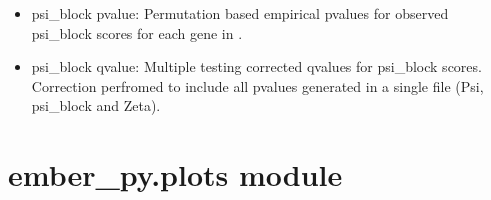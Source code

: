 \documentclass[letterpaper,10pt,english]{sphinxmanual}
\begin{document}
\begin{fulllineitems}
\begin{itemize}
\item {} 
\sphinxAtStartPar
psi\_block p\sphinxhyphen{}value: Permutation based empirical p\sphinxhyphen{}values for observed psi\_block scores for each gene in .

\item {} 
\sphinxAtStartPar
psi\_block q\sphinxhyphen{}value: Multiple testing corrected q\sphinxhyphen{}values for psi\_block scores. Correction perfromed to include all p\sphinxhyphen{}values generated in a single file (Psi, psi\_block and Zeta).

\end{itemize}

\end{fulllineitems}



\section{ember\_py.plots module}
\label{\detokenize{ember_py:module-ember_py.plots}}\label{\detokenize{ember_py:ember-py-plots-module}}
\end{document}
